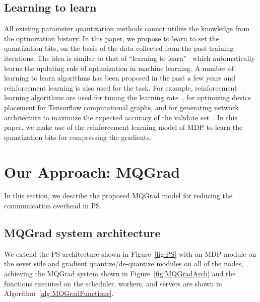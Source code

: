 \documentclass[sigconf]{acmart}
\begin{document}
\subsection{Learning to learn}
All existing parameter quantization methods cannot utilize the knowledge from the optimization history. In this paper, we propose to learn to set the quantization bits, on the basis of the data collected from the past training iterations. The idea is similar to that of ``learning to learn''~\cite{andrychowicz2016learning} which automatically learns the updating rule of optimization in machine learning. A number of learning to learn algorithms has been proposed in the past a few years and reinforcement learning is also used for the task. For example, reinforcement learning algorithms are used for tuning the learning rate~\cite{fu2016deep,daniel2016learning,xu2017reinforcement}, for optimizing device placement for Tensorflow computational graphs\cite{mirhoseini2017device}, and for generating network architecture to maximize the expected accuracy of the validate set~\cite{zoph2016neural}. In this paper, we make use of the reinforcement learning model of MDP to learn the quantization bits for compressing the gradients.




\section{Our Approach: MQGrad}
In this section, we describe the proposed MQGrad model for reducing the communication overhead in PS. %


\subsection{MQGrad system architecture}
We extend the PS architecture shown in Figure~\ref{fig:PS} with an MDP module on the sever side and gradient quantize/de-quantize modules on all of the nodes, achieving the MQGrad system shown in Figure~\ref{fig:MQGradArch} and the functions executed on the scheduler, workers, and servers are shown in Algorithm~\ref{alg:MQGradFunctions}.


\end{document}
